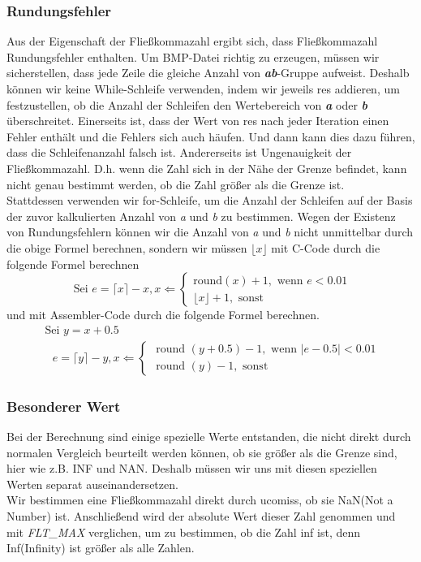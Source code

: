 \documentclass[course=erap]{aspdoc}
\begin{document}
\subsubsection{Rundungsfehler}
Aus der Eigenschaft der Fließkommazahl ergibt sich, dass Fließkommazahl Rundungsfehler enthalten. Um BMP-Datei richtig zu erzeugen, müssen wir sicherstellen, dass jede Zeile die gleiche Anzahl von \textbf{\emph{ab}}-Gruppe aufweist. Deshalb können wir keine While-Schleife verwenden, indem wir jeweils res addieren, um festzustellen, ob die Anzahl der Schleifen den Wertebereich von \emph{\textbf{a}} oder \textbf{\emph{b}} überschreitet. Einerseits ist, dass der Wert von res nach jeder Iteration einen Fehler enthält und die Fehlers sich auch häufen. Und dann kann dies dazu führen, dass die Schleifenanzahl falsch ist. Andererseits ist Ungenauigkeit der Fließkommazahl. D.h. wenn die Zahl sich in der Nähe der Grenze befindet, kann nicht genau bestimmt werden, ob die Zahl größer als die Grenze ist.
\\Stattdessen verwenden wir for-Schleife, um die Anzahl der Schleifen auf der Basis der zuvor kalkulierten Anzahl von \emph{a} und \emph{b} zu bestimmen. Wegen der Existenz von Rundungsfehlern können wir die Anzahl von \emph{a} und \emph{b} nicht unmittelbar durch die obige Formel berechnen, sondern wir müssen $\lfloor x \rfloor$ mit C-Code durch die folgende Formel berechnen
\begin{equation}
\text { Sei } e=\lceil x\rceil- x, x \Leftarrow\left\{\begin{array}{c}{\text {round}(x)+1, \text { wenn } e<0.01} \\ {\lfloor x\rfloor+ 1, \text { sonst }}\end{array}\right.
\end{equation}
und mit Assembler-Code durch die folgende Formel berechnen.
\begin{equation}
\begin{array}{l}{\text { Sei } y=x+0.5} \\ {\quad e=\lceil y\rceil- y, x \Leftarrow\left\{\begin{array}{c}{\text { round }(y+0.5)-1, \text { wenn }|e-0.5|<0.01} \\ {\text { round }(y)-1, \text { sonst }}\end{array}\right.}\end{array}
\end{equation}
\subsubsection{Besonderer Wert}
Bei der Berechnung sind einige spezielle Werte entstanden, die nicht direkt durch normalen Vergleich beurteilt werden können, ob sie größer als die Grenze sind, hier wie z.B. INF und NAN. Deshalb müssen wir uns mit diesen speziellen Werten separat auseinandersetzen.
\\Wir bestimmen eine Fließkommazahl direkt durch ucomiss, ob sie NaN(Not a Number) ist. Anschließend wird der absolute Wert dieser Zahl genommen und mit \emph{FLT\_MAX} verglichen, um zu bestimmen, ob die Zahl inf ist, denn Inf(Infinity) ist größer als alle Zahlen.
\end{document}
